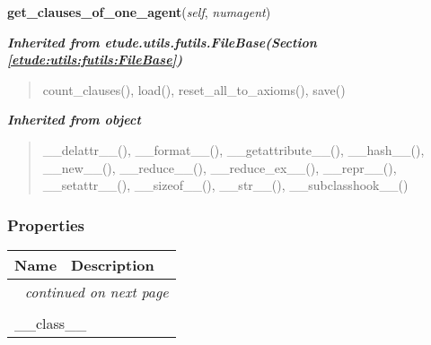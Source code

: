     \vspace{0.5ex}

\hspace{.8\funcindent}\begin{boxedminipage}{\funcwidth}

    \raggedright \textbf{get\_clauses\_of\_one\_agent}(\textit{self}, \textit{numagent})

\setlength{\parskip}{2ex}
\setlength{\parskip}{1ex}
    \end{boxedminipage}


\large{\textbf{\textit{Inherited from etude.utils.futils.FileBase\textit{(Section \ref{etude:utils:futils:FileBase})}}}}

\begin{quote}
count\_clauses(), load(), reset\_all\_to\_axioms(), save()
\end{quote}

\large{\textbf{\textit{Inherited from object}}}

\begin{quote}
\_\_delattr\_\_(), \_\_format\_\_(), \_\_getattribute\_\_(), \_\_hash\_\_(), \_\_new\_\_(), \_\_reduce\_\_(), \_\_reduce\_ex\_\_(), \_\_repr\_\_(), \_\_setattr\_\_(), \_\_sizeof\_\_(), \_\_str\_\_(), \_\_subclasshook\_\_()
\end{quote}


  \subsubsection{Properties}

    \vspace{-1cm}
\hspace{\varindent}\begin{longtable}{|p{\varnamewidth}|p{\vardescrwidth}|l}
\cline{1-2}
\cline{1-2} \centering \textbf{Name} & \centering \textbf{Description}& \\
\cline{1-2}
\endhead\cline{1-2}\multicolumn{3}{r}{\small\textit{continued on next page}}\\\endfoot\cline{1-2}
\endlastfoot\multicolumn{2}{|l|}{\textit{Inherited from object}}\\
\multicolumn{2}{|p{\varwidth}|}{\raggedright \_\_class\_\_}\\
\cline{1-2}
\end{longtable}

